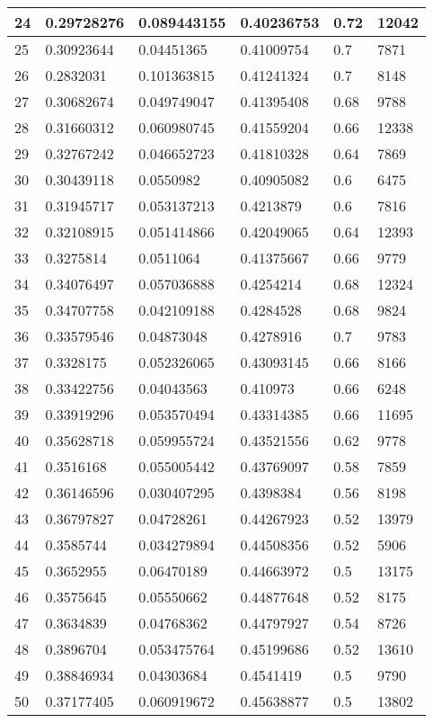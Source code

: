 \begin{longtable}{|l|l|l|l|l|l|}
24 & 0.29728276 & 0.089443155 & 0.40236753 & 0.72 & 12042 \\ \hline 
25 & 0.30923644 & 0.04451365 & 0.41009754 & 0.7 & 7871 \\ \hline 
26 & 0.2832031 & 0.101363815 & 0.41241324 & 0.7 & 8148 \\ \hline 
27 & 0.30682674 & 0.049749047 & 0.41395408 & 0.68 & 9788 \\ \hline 
28 & 0.31660312 & 0.060980745 & 0.41559204 & 0.66 & 12338 \\ \hline 
29 & 0.32767242 & 0.046652723 & 0.41810328 & 0.64 & 7869 \\ \hline 
30 & 0.30439118 & 0.0550982 & 0.40905082 & 0.6 & 6475 \\ \hline 
31 & 0.31945717 & 0.053137213 & 0.4213879 & 0.6 & 7816 \\ \hline 
32 & 0.32108915 & 0.051414866 & 0.42049065 & 0.64 & 12393 \\ \hline 
33 & 0.3275814 & 0.0511064 & 0.41375667 & 0.66 & 9779 \\ \hline 
34 & 0.34076497 & 0.057036888 & 0.4254214 & 0.68 & 12324 \\ \hline 
35 & 0.34707758 & 0.042109188 & 0.4284528 & 0.68 & 9824 \\ \hline 
36 & 0.33579546 & 0.04873048 & 0.4278916 & 0.7 & 9783 \\ \hline 
37 & 0.3328175 & 0.052326065 & 0.43093145 & 0.66 & 8166 \\ \hline 
38 & 0.33422756 & 0.04043563 & 0.410973 & 0.66 & 6248 \\ \hline 
39 & 0.33919296 & 0.053570494 & 0.43314385 & 0.66 & 11695 \\ \hline 
40 & 0.35628718 & 0.059955724 & 0.43521556 & 0.62 & 9778 \\ \hline 
41 & 0.3516168 & 0.055005442 & 0.43769097 & 0.58 & 7859 \\ \hline 
42 & 0.36146596 & 0.030407295 & 0.4398384 & 0.56 & 8198 \\ \hline 
43 & 0.36797827 & 0.04728261 & 0.44267923 & 0.52 & 13979 \\ \hline 
44 & 0.3585744 & 0.034279894 & 0.44508356 & 0.52 & 5906 \\ \hline 
45 & 0.3652955 & 0.06470189 & 0.44663972 & 0.5 & 13175 \\ \hline 
46 & 0.3575645 & 0.05550662 & 0.44877648 & 0.52 & 8175 \\ \hline 
47 & 0.3634839 & 0.04768362 & 0.44797927 & 0.54 & 8726 \\ \hline 
48 & 0.3896704 & 0.053475764 & 0.45199686 & 0.52 & 13610 \\ \hline 
49 & 0.38846934 & 0.04303684 & 0.4541419 & 0.5 & 9790 \\ \hline 
50 & 0.37177405 & 0.060919672 & 0.45638877 & 0.5 & 13802 \\ \hline 
\end{longtable}